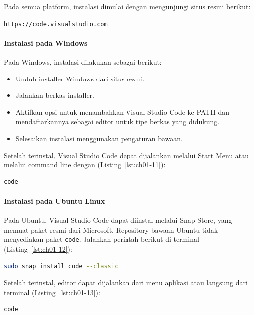 Pada semua platform, instalasi dimulai dengan mengunjungi situs resmi berikut:

\texttt{https://code.visualstudio.com}

\paragraph{Instalasi pada Windows}

Pada Windows, instalasi dilakukan sebagai berikut:

\begin{itemize}
  \item Unduh installer Windows dari situs resmi.
  \item Jalankan berkas installer.
  \item Aktifkan opsi untuk menambahkan Visual Studio Code ke PATH dan
        mendaftarkannya sebagai editor untuk tipe berkas yang didukung.
  \item Selesaikan instalasi menggunakan pengaturan bawaan.
\end{itemize}

Setelah terinstal, Visual Studio Code dapat dijalankan melalui Start Menu atau
melalui command line dengan (Listing~\ref{lst:ch01-11}):

\begin{lstlisting}[language=bash, caption={Perintah code}, label={lst:ch01-11}]
code
\end{lstlisting}

\paragraph{Instalasi pada Ubuntu Linux}

Pada Ubuntu, Visual Studio Code dapat diinstal melalui Snap Store, yang memuat
paket resmi dari Microsoft. Repository bawaan Ubuntu tidak menyediakan paket
\texttt{code}. Jalankan perintah berikut di terminal (Listing~\ref{lst:ch01-12}):

\begin{lstlisting}[language=bash, caption={Memasang Visual Studio Code melalui Snap}, label={lst:ch01-12}]
sudo snap install code --classic
\end{lstlisting}

Setelah terinstal, editor dapat dijalankan dari menu aplikasi atau langsung dari
terminal (Listing~\ref{lst:ch01-13}):

\begin{lstlisting}[language=bash, caption={Perintah code (2)}, label={lst:ch01-13}]
code
\end{lstlisting}

